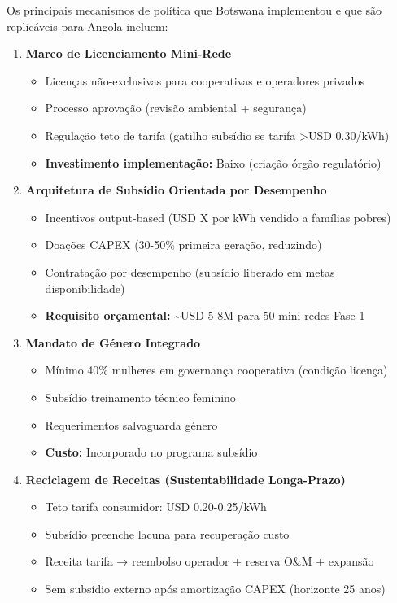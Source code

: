 \documentclass[12pt, a4paper]{article}
\begin{document}
Os principais mecanismos de política que Botswana implementou e que são replicáveis para Angola incluem:

\begin{enumerate}
\item \textbf{Marco de Licenciamento Mini-Rede}
   \begin{itemize}
   \item Licenças não-exclusivas para cooperativas e operadores privados
   \item Processo aprovação (revisão ambiental + segurança)
   \item Regulação teto de tarifa (gatilho subsídio se tarifa >USD 0.30/kWh)
   \item \textbf{Investimento implementação:} Baixo (criação órgão regulatório)
   \end{itemize}

\item \textbf{Arquitetura de Subsídio Orientada por Desempenho}
   \begin{itemize}
   \item Incentivos output-based (USD X por kWh vendido a famílias pobres)
   \item Doações CAPEX (30-50\% primeira geração, reduzindo)
   \item Contratação por desempenho (subsídio liberado em metas disponibilidade)
   \item \textbf{Requisito orçamental:} \textasciitilde{}USD 5-8M para 50 mini-redes Fase 1
   \end{itemize}

\item \textbf{Mandato de Género Integrado}
   \begin{itemize}
   \item Mínimo 40\% mulheres em governança cooperativa (condição licença)
   \item Subsídio treinamento técnico feminino
   \item Requerimentos salvaguarda género
   \item \textbf{Custo:} Incorporado no programa subsídio
   \end{itemize}

\item \textbf{Reciclagem de Receitas (Sustentabilidade Longa-Prazo)}
   \begin{itemize}
   \item Teto tarifa consumidor: USD 0.20-0.25/kWh
   \item Subsídio preenche lacuna para recuperação custo
   \item Receita tarifa → reembolso operador + reserva O\&M + expansão
   \item Sem subsídio externo após amortização CAPEX (horizonte 25 anos)
   \end{itemize}
\end{enumerate}
\end{document}
